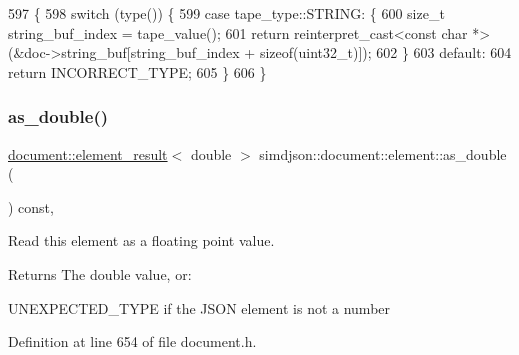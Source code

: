 \begin{DoxyCode}
597                                                                                      \{
598   \textcolor{keywordflow}{switch} (type()) \{
599     \textcolor{keywordflow}{case} tape\_type::STRING: \{
600       \textcolor{keywordtype}{size\_t} string\_buf\_index = tape\_value();
601       \textcolor{keywordflow}{return} \textcolor{keyword}{reinterpret\_cast<}\textcolor{keyword}{const }\textcolor{keywordtype}{char} *\textcolor{keyword}{>}(&doc->string\_buf[string\_buf\_index + \textcolor{keyword}{sizeof}(uint32\_t)]);
602     \}
603     \textcolor{keywordflow}{default}:
604       \textcolor{keywordflow}{return} INCORRECT\_TYPE;
605   \}
606 \}
\end{DoxyCode}
\mbox{\label{classsimdjson_1_1document_1_1element_a1d6014890ca8f9fddbd97ab8c81a711c}} 
\subsubsection{\texorpdfstring{as\+\_\+double()}{as\_double()}}
{\footnotesize\ttfamily \hyperlink{classsimdjson_1_1document_1_1element__result}{document\+::element\+\_\+result}$<$ double $>$ simdjson\+::document\+::element\+::as\+\_\+double (\begin{DoxyParamCaption}{ }\end{DoxyParamCaption}) const\hspace{0.3cm}{\ttfamily [inline]}, {\ttfamily [noexcept]}}



Read this element as a floating point value. 

\begin{DoxyReturn}{Returns}
The double value, or\+:
\begin{DoxyItemize}
\item U\+N\+E\+X\+P\+E\+C\+T\+E\+D\+\_\+\+T\+Y\+PE if the J\+S\+ON element is not a number 
\end{DoxyItemize}
\end{DoxyReturn}


Definition at line 654 of file document.\+h.


